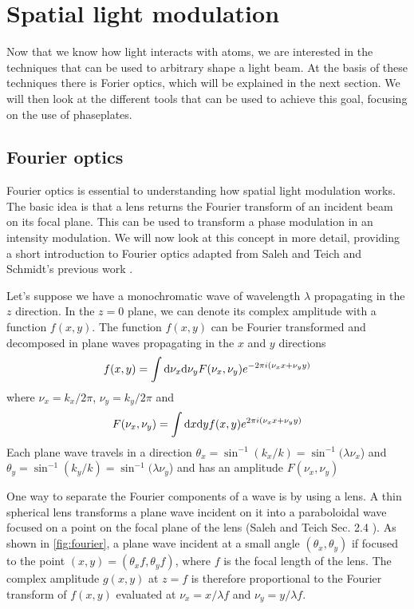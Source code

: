\section{Spatial light modulation}
Now that we know how light interacts with atoms, we are interested in the techniques that can be used to arbitrary shape a light beam. At the basis of these techniques there is Forier optics, which will be explained in the next section. We will then look at the different tools that can be used to achieve this goal, focusing on the use of phaseplates.

\subsection{Fourier optics}
Fourier optics is essential to understanding how spatial light modulation works. The basic idea  is that a lens returns the Fourier transform of an incident beam on its focal plane. This can be used to transform a phase modulation in an intensity modulation. We will now look at this concept in more detail, providing a short introduction to Fourier optics adapted from Saleh and Teich \cite{saleh1991} and Schmidt's previous work \cite{schmidt2021}.

Let's suppose we have a monochromatic wave of wavelength $\lambda$ propagating in the $z$ direction. In the $z=0$ plane, we can denote its complex amplitude with a function $f(x,y)$. The function $f(x,y)$ can be Fourier transformed and decomposed in plane waves propagating in the $x$ and $y$ directions
\begin{equation}
    f(x,y) = \int \differential \nu_x \differential \nu_y F(\nu_x, \nu_y) e^{-2\pi i(\nu_xx+\nu_yy)}
\end{equation}
where $\nu_x = k_x / 2\pi$, $\nu_y = k_y / 2\pi$ and
\begin{equation}
    F(\nu_x,\nu_y) = \int \differential x \differential y f(x, y) e^{2\pi i(\nu_xx+\nu_yy)}
\end{equation}
Each plane wave travels in a direction $\theta_x = \sin^{-1}(k_x / k) = \sin^{-1}(\lambda \nu_x$) and $\theta_y = \sin^{-1}(k_y / k) = \sin^{-1}(\lambda \nu_y$) and has an amplitude $F(\nu_x, \nu_y)$

One way to separate the Fourier components of a wave is by using a lens. A thin spherical lens transforms a plane wave incident on it into a paraboloidal wave focused on a point on the focal plane of the lens (Saleh and Teich Sec. 2.4 \cite{saleh1991}). As shown in \cref{fig:fourier}, a plane wave incident at a small angle $(\theta_x, \theta_y)$ if focused to the point $(x,y) = (\theta_x f, \theta_y f)$, where $f$ is the focal length of the lens. The complex amplitude $g(x,y)$ at $z=f$ is therefore proportional to the Fourier transform of $f(x,y)$ evaluated at $\nu_x = x / \lambda f$ and $\nu_y = y / \lambda f$.

